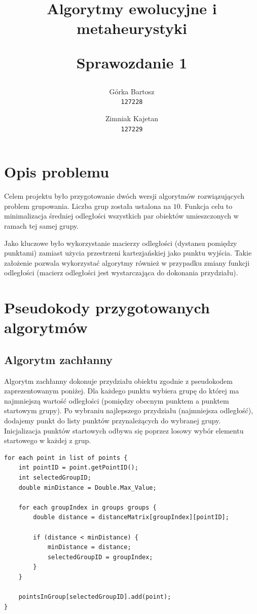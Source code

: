 \documentclass{mwart}
\title{
    \textbf{Algorytmy ewolucyjne i metaheurystyki}\\ 
    \begin{large} 
        Sprawozdanie 1
    \end{large}
}
\author{
    Górka Bartosz\\
  \texttt{127228}
  \and
  Zimniak Kajetan\\
  \texttt{127229}
}
\date{}
\begin{document}
\maketitle

\section{Opis problemu}
Celem projektu było przygotowanie dwóch wersji algorytmów rozwiązujących problem grupowania. Liczba grup została ustalona na $10$. Funkcja celu to minimalizacja średniej odległości wszystkich par obiektów umieszczonych w ramach tej samej grupy.

Jako kluczowe było wykorzystanie macierzy odległości (dystansu pomiędzy punktami) zamiast użycia przestrzeni kartezjańskiej jako punktu wyjścia. Takie założenie pozwala wykorzystać algorytmy również w przypadku zmiany funkcji odległości (macierz odległości jest wystarczająca do dokonania przydziału).

\section{Pseudokody przygotowanych algorytmów}
\subsection{Algorytm zachłanny}
Algorytm zachłanny dokonuje przydziału obiektu zgodnie z pseudokodem zaprezentowanym poniżej. Dla każdego punktu wybiera grupę do której ma najmniejszą wartość odległości (pomiędzy obecnym punktem a punktem startowym grupy). Po wybraniu najlepszego przydziału (najmniejsza odległość), dodajemy punkt do listy punktów przynależących do wybranej grupy. Inicjalizacja punktów startowych odbywa się poprzez losowy wybór elementu startowego w każdej z grup.

\begin{lstlisting}[style=JavaStyle]
for each point in list of points {
    int pointID = point.getPointID();
    int selectedGroupID;
    double minDistance = Double.Max_Value;

    for each groupIndex in groups groups {
        double distance = distanceMatrix[groupIndex][pointID];
        
        if (distance < minDistance) {
            minDistance = distance;
            selectedGroupID = groupIndex;
        }
    }

    pointsInGroup[selectedGroupID].add(point);
}
\end{lstlisting}
\end{document}
